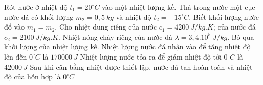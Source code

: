 	\begin{ex}
	Rót nước ở nhiệt độ $t_1=20^\circ C$ vào một nhiệt lượng kế. Thả trong nước một cục nước đá có khối lượng $m_2=0,5 \ kg$ và nhiệt độ $t_2=-15^\circ C$. Biết khối lượng nước đổ vào $m_1=m_2$. Cho nhiệt dung riêng của nước $c_1=4200 \ J / kg . K$; của nước đá $c_2=2100 \ J / kg . K$. Nhiệt nóng chảy riêng của nước đá $\lambda=3,4.10^{5} \ J /kg$. Bỏ qua khối lượng của nhiệt lượng kế.
	{Nhiệt lượng nước đá nhận vào để tăng nhiệt độ lên đến $0^\circ C$ là $170000 \ J$}
	{\True Nhiệt lượng nước tỏa ra để giảm nhiệt độ tới $0^\circ C$ là $42000 \ J$}
	{Sau khi cân bằng nhiệt được thiết lập, nước đá tan hoàn toàn và nhiệt độ của hỗn hợp là $0^\circ C$}
	\end{ex}
